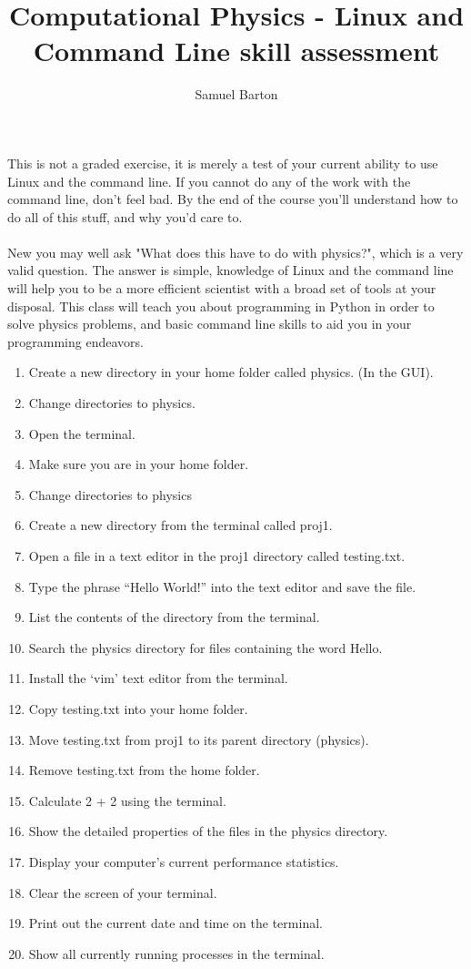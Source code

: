 \documentclass{article}
\title{Computational Physics - Linux and Command Line skill assessment}
\author {Samuel Barton}
\begin{document}
	
	\maketitle
	
	This is not a graded exercise, it is merely a test of your current ability to use Linux and the command line. If you cannot do any of the work with the command line, don't feel bad. By the end of the course you'll understand how to do all of this stuff, and why you'd care to.
\\
\\
	New you may well ask "What does this have to do with physics?", which is a very valid question. The answer is simple, knowledge of Linux and the command line will help you to be a more efficient scientist with a broad set of tools at your disposal. This class will teach you about programming in Python in order to solve physics problems, and basic command line skills to aid you in your programming endeavors.
	
	\newpage
	
	\begin{enumerate}
		\item Create a new directory in your home folder called physics. (In the GUI).
		\item Change directories to physics. 
		\item Open the terminal. 
		\item Make sure you are in your home folder.
		\item Change directories to physics
		\item Create a new directory from the terminal called proj1.
		\item Open a file in a text editor in the proj1 directory called testing.txt.
		\item Type the phrase “Hello World!” into the text editor and save the file.
		\item List the contents of the directory from the terminal.
		\item Search the physics directory for files containing the word Hello.
		\item Install the ‘vim’ text editor from the terminal.
		\item Copy testing.txt into your home folder.
		\item Move testing.txt from proj1 to its parent directory (physics).
		\item Remove testing.txt from the home folder.
		\item Calculate 2 + 2 using the terminal.
		\item Show the detailed properties of the files in the physics directory.
		\item Display your computer’s current performance statistics.
		\item Clear the screen of your terminal.
		\item Print out the current date and time on the terminal.
		\item Show all currently running processes in the terminal.
	\end{enumerate}
\end{document}
